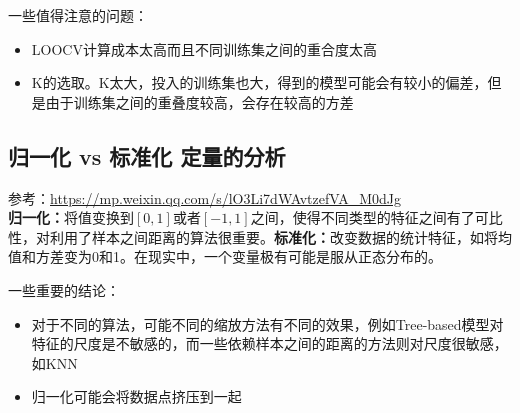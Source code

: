 一些值得注意的问题：
\begin{itemize}
	\item LOOCV计算成本太高而且不同训练集之间的重合度太高
	\item K的选取。K太大，投入的训练集也大，得到的模型可能会有较小的偏差，但是由于训练集之间的重叠度较高，会存在较高的方差
\end{itemize}


\subsection{归一化 vs 标准化 定量的分析}
参考：\href{https://mp.weixin.qq.com/s/lO3Li7dWAvtzefVA_M0dJg}{https://mp.weixin.qq.com/s/lO3Li7dWAvtzefVA\_M0dJg}\\
\textbf{归一化：}将值变换到$[0, 1]$或者$[-1, 1]$之间，使得不同类型的特征之间有了可比性，对利用了样本之间距离的算法很重要。\textbf{标准化：}改变数据的统计特征，如将均值和方差变为0和1。在现实中，一个变量极有可能是服从正态分布的。


一些重要的结论：
\begin{itemize}
	\item 对于不同的算法，可能不同的缩放方法有不同的效果，例如Tree-based模型对特征的尺度是不敏感的，而一些依赖样本之间的距离的方法则对尺度很敏感，如KNN
	\item 归一化可能会将数据点挤压到一起
\end{itemize}

